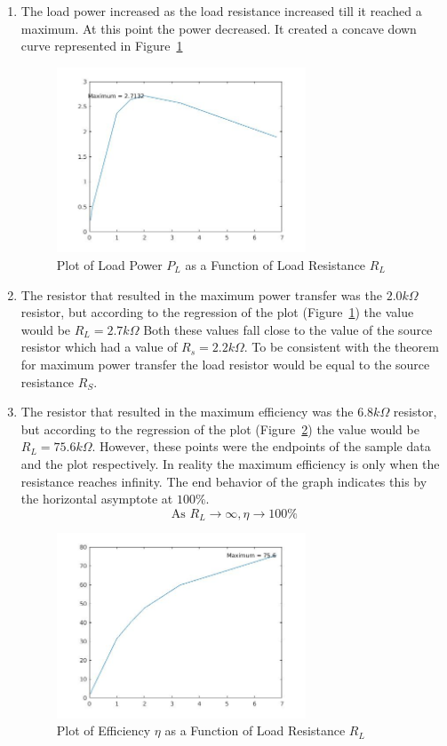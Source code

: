 \documentclass{article}
\begin{document}
\begin{enumerate}
  \item The load power increased as the load resistance increased till it reached a maximum.
  At this point the power decreased. It created a concave down curve represented in Figure~\ref{fig:loadpower}
    \begin{figure}[!ht]
  \centering
  \caption{Plot of Load Power $P_L$ as a Function of Load Resistance $R_L$\label{fig:loadpower}}
  \includegraphics[width=0.7\textwidth]{img/plotd.jpg}
  \end{figure}


  \item The resistor that resulted in the maximum power transfer was the $2.0 k\Omega$
    resistor, but according to the regression of the plot (Figure~\ref{fig:loadpower}) the value would be $R_L = 2.7 k\Omega$
    Both these values fall close to the value of the source resistor which
    had a value of $R_s = 2.2 k\Omega$. To be consistent with the theorem for maximum
    power transfer the load resistor would be equal to the source resistance $R_S$.
  \item The resistor that resulted in the maximum efficiency was the $6.8k \Omega$
  resistor, but according to the regression of the plot (Figure~\ref{fig:loadeff}) the value would
  be $R_L = 75.6 k\Omega$. However, these points were the endpoints of the sample data
   and the plot respectively. In reality the maximum efficiency is only when the resistance
   reaches infinity. The end behavior of the graph indicates this by the horizontal asymptote at $100\%$.
   \[\text{As } R_L \to \infty , \eta \to 100\% \]
     \begin{figure}[!ht]
  \centering
  \caption{Plot of Efficiency $\eta$ as a Function of Load Resistance $R_L$\label{fig:loadeff}}
  \includegraphics[width=0.7\textwidth]{img/plote.jpg}
  \end{figure}


\end{enumerate}
\end{document}

